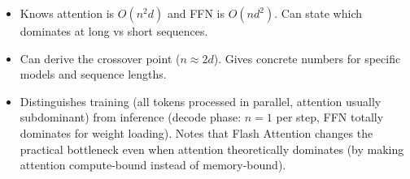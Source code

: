 \begin{interviewq}
\goodgreat
\begin{itemize}
    \item {} Knows attention is $O(n^2 d)$ and FFN is $O(nd^2)$. Can state which dominates at long vs short sequences.
    \item {} Can derive the crossover point ($n \approx 2d$). Gives concrete numbers for specific models and sequence lengths.
    \item {} Distinguishes training (all tokens processed in parallel, attention usually subdominant) from inference (decode phase: $n=1$ per step, FFN totally dominates for weight loading). Notes that Flash Attention changes the practical bottleneck even when attention theoretically dominates (by making attention compute-bound instead of memory-bound).
\end{itemize}

\end{interviewq}

